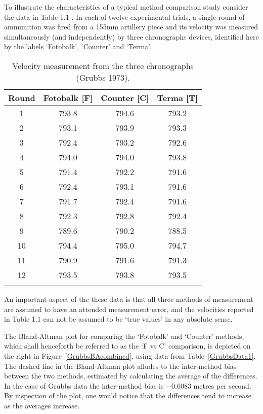 \documentclass[12pt, a4paper]{report}
\theoremstyle{plain}
\theoremstyle{definition}
\theoremstyle{remark}
\begin{document}
	To illustrate the characteristics of a typical method comparison
	study consider the data in Table 1.1 \citep{Grubbs73}. In each of
	twelve experimental trials, a single round of ammunition was fired
	from a 155mm artillery piece and its velocity was measured simultaneously (and
	independently) by three chronographs devices, identified here by
	the labels `Fotobalk', `Counter' and `Terma'.
	\smallskip
	\begin{table}[ht]
		\begin{center}
			\begin{tabular}{|c|c|c|c|}
				\hline
				Round& Fotobalk [F] & Counter [C]& Terma [T]\\
				\hline
				1 & 793.8 & 794.6 & 793.2 \\
				2 & 793.1 & 793.9 & 793.3 \\
				3 & 792.4 & 793.2 & 792.6 \\
				4 & 794.0 & 794.0 & 793.8 \\
				5 & 791.4 & 792.2 & 791.6 \\
				6 & 792.4 & 793.1 & 791.6 \\
				7 & 791.7 & 792.4 & 791.6 \\
				8 & 792.3 & 792.8 & 792.4 \\
				9 & 789.6 & 790.2 & 788.5 \\
				10 & 794.4 & 795.0 & 794.7 \\
				11 & 790.9 & 791.6 & 791.3 \\
				12 & 793.5 & 793.8 & 793.5 \\
				\phantom{makespace} & \phantom{makespace} & \phantom{makespace} & \phantom{makespace} \\ \hline 
			\end{tabular}
			\caption{Velocity measurement from the three chronographs (Grubbs
				1973).}
		\end{center}
		\label{FCTdata}
	\end{table}
	
	An important aspect of the these data is that all three methods of
	measurement are assumed to have an attended measurement error, and
	the velocities reported in Table 1.1 can not be assumed to be
	`true values' in any absolute sense.

The Bland-Altman plot for comparing the `Fotobalk' and `Counter' methods, which shall henceforth be referred to as the `F vs C' comparison, is depicted on the right in Figure~\ref{GrubbsBAcombined}, using data from Table~\ref{GrubbsData1}. The dashed line in the Bland-Altman plot alludes to the inter-method bias between the two methods, estimated by calculating the average of the differences. In the case of Grubbs data the inter-method bias is $-0.6083$ metres per second. By inspection of the plot, one would notice that the differences tend to increase as the averages increase.
\end{document}
